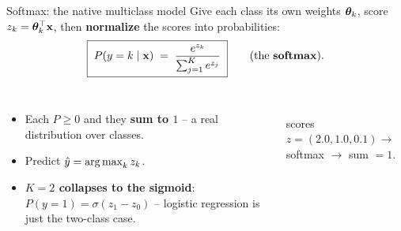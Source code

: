 \documentclass[aspectratio=169]{beamer}
\begin{document}
\begin{frame}{Softmax: the native multiclass model}
  Give each class its own weights $\bm{\theta}_k$, score $z_k = \bm{\theta}_k^\top\mathbf{x}$, then
  \textbf{normalize} the scores into probabilities:
  \[
    \boxed{\; P(y=k \mid \mathbf{x}) \;=\; \frac{e^{z_k}}{\sum_{j=1}^{K} e^{z_j}} \;}
    \qquad (\text{the \textbf{softmax}}).
  \]
  \begin{columns}[T]
    \begin{itemize}\small
      \item Each $P \ge 0$ and they \textbf{sum to $1$} -- a real distribution over classes.
      \item Predict $\hat y = \mathop{\mathrm{arg\,max}}_k z_k$.
      \item \textbf{$K=2$ collapses to the sigmoid}: $P(y{=}1)=\sigma(z_1-z_0)$ -- logistic
        regression is just the two-class case.
    \end{itemize}
    \begin{center}
      \\[-3pt]
      \scriptsize scores $z=(2.0,1.0,0.1)\to$ softmax $\to$ sum $=1$.
    \end{center}
  \end{columns}
\end{frame}
\end{document}
